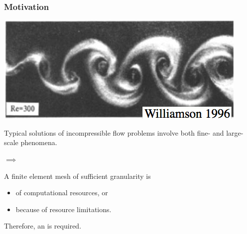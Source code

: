 \documentclass[mathserif]{beamer}
\newcommand{\pecosbold}[1]{{\color{pecos2}{#1}}}
\begin{document}
\begin{frame}
\frametitle{Motivation}

\begin{center}\nocite{Williamson1996}
\includegraphics[scale=.5]{../figures/cylinderWakeRe300Williamson.png}\\
\end{center}

Typical solutions of incompressible flow problems involve both fine- and large-scale phenomena.

\begin{center}
$\implies$
\end{center}

A \pecosbold{uniform} finite element mesh of sufficient granularity is
\begin{itemize}
\item \pecosbold{wasteful} of computational resources, or
\item \pecosbold{infeasible} because of resource limitations.
\end{itemize}

\vspace{3mm}
\begin{center}
Therefore, an \pecosbold{adaptive mesh} is required.
\end{center}

\end{frame}
\end{document}
